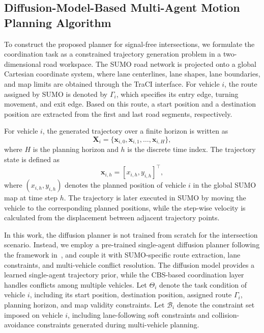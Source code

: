 \documentclass[journal]{IEEEtran}
\begin{document}
\subsection{Diffusion-Model-Based Multi-Agent Motion Planning Algorithm}

To construct the proposed planner for signal-free intersections, we formulate the coordination task as a constrained trajectory generation problem in a two-dimensional road workspace. The SUMO road network is projected onto a global Cartesian coordinate system, where lane centerlines, lane shapes, lane boundaries, and map limits are obtained through the TraCI interface. For vehicle $i$, the route assigned by SUMO is denoted by $\Gamma_i$, which specifies its entry edge, turning movement, and exit edge. Based on this route, a start position and a destination position are extracted from the first and last road segments, respectively.

For vehicle $i$, the generated trajectory over a finite horizon is written as
\begin{equation}
\mathbf{X}_i
=
\{\mathbf{x}_{i,0},\mathbf{x}_{i,1},\ldots,\mathbf{x}_{i,H}\},
\label{eq_vehicle_traj_def}
\end{equation}
where $H$ is the planning horizon and $h$ is the discrete time index. The trajectory state is defined as
\begin{equation}
\mathbf{x}_{i,h}
=
[x_{i,h},y_{i,h}]^\top,
\label{eq_vehicle_state_def}
\end{equation}
where $(x_{i,h},y_{i,h})$ denotes the planned position of vehicle $i$ in the global SUMO map at time step $h$. The trajectory is later executed in SUMO by moving the vehicle to the corresponding planned positions, while the step-wise velocity is calculated from the displacement between adjacent trajectory points.

In this work, the diffusion planner is not trained from scratch for the intersection scenario. Instead, we employ a pre-trained single-agent diffusion planner following the framework in~\cite{shaoul2025}, and couple it with SUMO-specific route extraction, lane constraints, and multi-vehicle conflict resolution. The diffusion model provides a learned single-agent trajectory prior, while the CBS-based coordination layer handles conflicts among multiple vehicles. Let $\Theta_i$ denote the task condition of vehicle $i$, including its start position, destination position, assigned route $\Gamma_i$, planning horizon, and map validity constraints. Let $\mathcal{B}_i$ denote the constraint set imposed on vehicle $i$, including lane-following soft constraints and collision-avoidance constraints generated during multi-vehicle planning.
\end{document}
